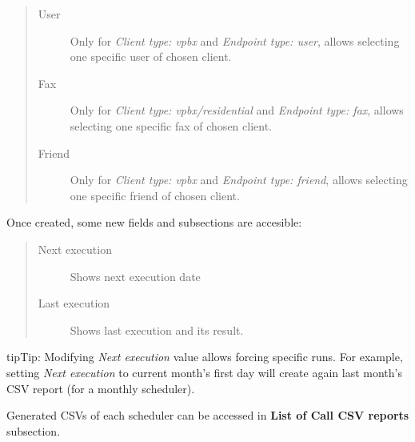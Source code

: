 \documentclass[letterpaper,10pt,english]{sphinxmanual}
\begin{document}
\begin{quote}
\begin{description}
\item[{User}] \leavevmode
Only for \emph{Client type: vpbx} and \emph{Endpoint type: user}, allows selecting one specific user of chosen client.

\item[{Fax}] \leavevmode
Only for \emph{Client type: vpbx/residential} and \emph{Endpoint type: fax}, allows selecting one specific fax of chosen client.

\item[{Friend}] \leavevmode
Only for \emph{Client type: vpbx} and \emph{Endpoint type: friend}, allows selecting one specific friend of chosen client.

\end{description}
\end{quote}

Once created, some new fields and subsections are accesible:
\begin{quote}
\begin{description}
\item[{Next execution}] \leavevmode
Shows next execution date

\item[{Last execution}] \leavevmode
Shows last execution and its result.

\end{description}
\end{quote}

\begin{notice}{tip}{Tip:}
Modifying \emph{Next execution} value allows forcing specific runs. For example, setting \emph{Next execution} to
current month's first day will create again last month's CSV report (for a monthly scheduler).
\end{notice}

Generated CSVs of each scheduler can be accessed in \textbf{List of Call CSV reports} subsection.
\end{document}
